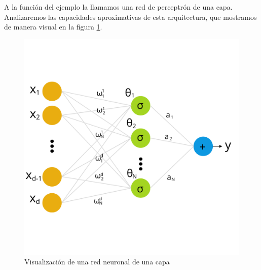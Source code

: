 \newp A la función del ejemplo la llamamos una red de perceptrón de una capa. Analizaremos las capacidades aproximativas de esta arquitectura, que mostramos de manera visual en la figura \ref{fig:MLP}.
\begin{figure}
    \centering
    \includegraphics[scale=1.2]{img/MLP.png}
    \caption{Visualización de una red neuronal de una capa}
    \label{fig:MLP}
\end{figure}

